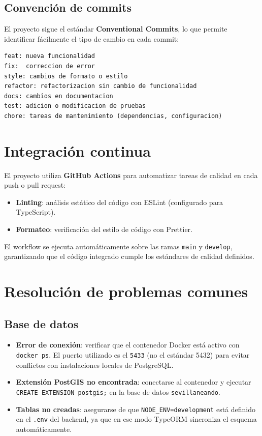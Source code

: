 \subsection{Convención de commits}

El proyecto sigue el estándar \textbf{Conventional Commits}, lo que permite identificar fácilmente el tipo de cambio en cada commit:

\begin{lstlisting}
feat: nueva funcionalidad
fix:  correccion de error
style: cambios de formato o estilo
refactor: refactorizacion sin cambio de funcionalidad
docs: cambios en documentacion
test: adicion o modificacion de pruebas
chore: tareas de mantenimiento (dependencias, configuracion)
\end{lstlisting}

\section{Integración continua}

El proyecto utiliza \textbf{GitHub Actions} para automatizar tareas de calidad en cada push o pull request:

\begin{itemize}
    \item \textbf{Linting}: análisis estático del código con ESLint (configurado para TypeScript).
    \item \textbf{Formateo}: verificación del estilo de código con Prettier.
\end{itemize}

El workflow se ejecuta automáticamente sobre las ramas \texttt{main} y \texttt{develop}, garantizando que el código integrado cumple los estándares de calidad definidos.

\section{Resolución de problemas comunes}

\subsection{Base de datos}

\begin{itemize}
    \item \textbf{Error de conexión}: verificar que el contenedor Docker está activo con \texttt{docker ps}. El puerto utilizado es el \texttt{5433} (no el estándar 5432) para evitar conflictos con instalaciones locales de PostgreSQL.
    \item \textbf{Extensión PostGIS no encontrada}: conectarse al contenedor y ejecutar \texttt{CREATE EXTENSION postgis;} en la base de datos \texttt{sevillaneando}.
    \item \textbf{Tablas no creadas}: asegurarse de que \texttt{NODE\_ENV=development} está definido en el \texttt{.env} del backend, ya que en ese modo TypeORM sincroniza el esquema automáticamente.
\end{itemize}

